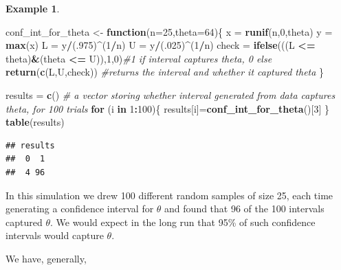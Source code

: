 \documentclass[
]{book}
\newenvironment{Shaded}{\begin{snugshade}}{\end{snugshade}}
\newcommand{\AttributeTok}[1]{\textcolor[rgb]{0.13,0.29,0.53}{#1}}
\newcommand{\CommentTok}[1]{\textcolor[rgb]{0.56,0.35,0.01}{\textit{#1}}}
\newcommand{\ControlFlowTok}[1]{\textcolor[rgb]{0.13,0.29,0.53}{\textbf{#1}}}
\newcommand{\DecValTok}[1]{\textcolor[rgb]{0.00,0.00,0.81}{#1}}
\newcommand{\FunctionTok}[1]{\textcolor[rgb]{0.13,0.29,0.53}{\textbf{#1}}}
\newcommand{\NormalTok}[1]{#1}
\newcommand{\OtherTok}[1]{\textcolor[rgb]{0.56,0.35,0.01}{#1}}
\newcommand{\SpecialCharTok}[1]{\textcolor[rgb]{0.81,0.36,0.00}{\textbf{#1}}}
\theoremstyle{definition}
\theoremstyle{definition}
\newtheorem{example}{Example}[chapter]
\theoremstyle{definition}
\theoremstyle{definition}
\theoremstyle{remark}
\begin{document}
\begin{example}
\begin{Shaded}
\begin{Highlighting}[]
\NormalTok{conf\_int\_for\_theta }\OtherTok{\textless{}{-}} \ControlFlowTok{function}\NormalTok{(}\AttributeTok{n=}\DecValTok{25}\NormalTok{,}\AttributeTok{theta=}\DecValTok{64}\NormalTok{)\{}
\NormalTok{  x }\OtherTok{=} \FunctionTok{runif}\NormalTok{(n,}\DecValTok{0}\NormalTok{,theta)}
\NormalTok{  y }\OtherTok{=} \FunctionTok{max}\NormalTok{(x)}
\NormalTok{  L }\OtherTok{=}\NormalTok{ y}\SpecialCharTok{/}\NormalTok{(.}\DecValTok{975}\NormalTok{)}\SpecialCharTok{\^{}}\NormalTok{(}\DecValTok{1}\SpecialCharTok{/}\NormalTok{n) }
\NormalTok{  U }\OtherTok{=}\NormalTok{ y}\SpecialCharTok{/}\NormalTok{(.}\DecValTok{025}\NormalTok{)}\SpecialCharTok{\^{}}\NormalTok{(}\DecValTok{1}\SpecialCharTok{/}\NormalTok{n)}
\NormalTok{  check }\OtherTok{=} \FunctionTok{ifelse}\NormalTok{(((L }\SpecialCharTok{\textless{}=}\NormalTok{ theta)}\SpecialCharTok{\&}\NormalTok{(theta }\SpecialCharTok{\textless{}=}\NormalTok{ U)),}\DecValTok{1}\NormalTok{,}\DecValTok{0}\NormalTok{)}\CommentTok{\#1 if interval captures theta, 0 else}
  \FunctionTok{return}\NormalTok{(}\FunctionTok{c}\NormalTok{(L,U,check)) }\CommentTok{\#returns the interval and whether it captured theta}
\NormalTok{\}}

\NormalTok{results }\OtherTok{=} \FunctionTok{c}\NormalTok{() }\CommentTok{\# a vector storing whether interval generated from data captures theta, for 100 trials}
\ControlFlowTok{for}\NormalTok{ (i }\ControlFlowTok{in} \DecValTok{1}\SpecialCharTok{:}\DecValTok{100}\NormalTok{)\{}
\NormalTok{  results[i]}\OtherTok{=}\FunctionTok{conf\_int\_for\_theta}\NormalTok{()[}\DecValTok{3}\NormalTok{]}
\NormalTok{\}}
\FunctionTok{table}\NormalTok{(results)}
\end{Highlighting}
\end{Shaded}

\begin{verbatim}
## results
##  0  1 
##  4 96
\end{verbatim}

In this simulation we drew 100 different random samples of size 25, each time generating a confidence interval for \(\theta\) and found that 96 of the 100 intervals captured \(\theta\). We would expect in the long run that 95\% of such confidence intervals would capture \(\theta\).
\end{example}

We have, generally,
\end{document}
